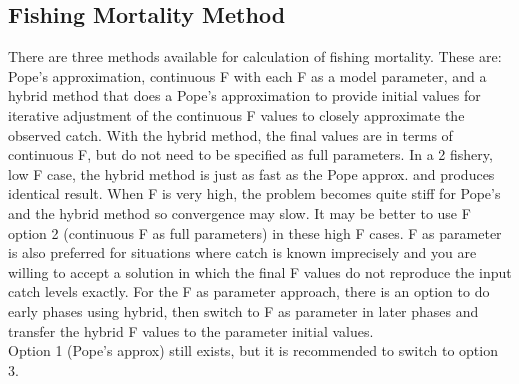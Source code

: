 \subsection{Fishing Mortality Method}
There are  three methods available for calculation of fishing mortality.  These are:  Pope’s approximation, continuous F with each F as a model parameter, and a hybrid method that does a Pope’s approximation to provide initial values for iterative adjustment of the continuous F values to closely approximate the observed catch.  With the hybrid method, the final values are in terms of continuous F, but do not need to be specified as full parameters.  In a 2 fishery, low F case, the hybrid method is just as fast as the Pope approx. and produces identical result.  When F is very high, the problem becomes quite stiff for Pope’s and the hybrid method so convergence may slow.  It may  be better to use F option 2 (continuous F as full parameters) in these high F cases.  F as parameter is also preferred for situations where catch is known imprecisely and you are willing to accept a solution in which the final F values do not reproduce the input catch levels exactly.  For the F as parameter approach, there is an option to do early phases using hybrid, then switch to F as parameter in later phases and transfer the hybrid F values to the parameter initial values.\\
Option 1 (Pope’s approx) still exists, but it is recommended to switch to option 3.

